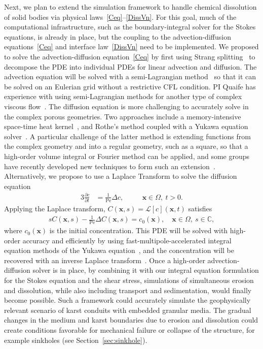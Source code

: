 \documentclass[11pt]{article}
\newcommand{\pd}[2]{ \frac{ \partial #1}{ \partial #2 } }
\newcommand{\bvec}[1]{{\mathbf{#1}}}
\newcommand{\Pe}{\mathrm{Pe}}
\newcommand{\xx}{\bvec{x}}
\begin{document}
Next, we plan to extend the simulation framework to handle chemical dissolution of solid bodies via physical laws~\eqref{Ceq}--\eqref{DissVn}. For this goal, much of the computational infrastructure, such as the boundary-integral solver for the Stokes equations, is already in place, but the coupling to the advection-diffusion equations~\eqref{Ceq} and interface law~\eqref{DissVn} need to be implemented.  We proposed to solve the advection-diffusion equation~\eqref{Ceq} by first using Strang splitting~\cite{str1968} to decompose the PDE into individual PDEs for linear advection and diffusion.  The advection equation will be solved with a semi-Lagrangian method~\cite{rob1981} so that it can be solved on an Eulerian grid without a restrictive CFL condition. PI Quaife has experience with using semi-Lagrangian methods for another type of complex viscous flow~\cite{kab-qua-bir2017}.  The diffusion equation is more challenging to accurately solve in the complex porous geometries.  Two approaches include a memory-intensive space-time heat kernel~\cite{bar-eps-gre-jia-wan2019, jia-gre-wan2015, li-gre2009}, and Rothe's method coupled with a Yukawa equation solver~\cite{kro-qua2010, cau-cho-chr-sea2016}. A particular challenge of the latter method is extending functions from the complex geometry and into a regular geometry, such as a square, so that a high-order volume integral or Fourier method can be applied, and some groups have recently developed new techniques to form such an extension~\cite{fry-kro-tor2019, fry-leh-tor2019}. Alternatively, we propose to use a Laplace Transform to solve the diffusion equation
\begin{alignat}{3}
  \pd{c}{t} &= \frac{1}{\Pe} \Delta c, \quad &&\xx \in \Omega, \: t>0.
\end{alignat}
Applying the Laplace transform, $C(\xx,s) = \mathcal{L}[c](\xx,t)$ satisfies
\begin{align}
  sC(\xx,s) - \frac{1}{\Pe}\Delta C(\xx,s) = c_0(\xx), 
    \quad \xx \in \Omega, \: s \in \mathbb{C},
  \label{eqn:DiffusionLaplace}
\end{align}
where $c_0(\xx)$ is the initial concentration. This PDE will be solved with high-order accuracy and efficiently by using fast-multipole-accelerated integral equation methods of the Yukawa equation~\cite{kro-qua2011}, and the concentration will be recovered with an inverse Laplace transform~\cite{jos-war2006}. Once a high-order advection-diffusion solver is in place, by combining it with our integral equation formulation for the Stokes equation and the shear stress, simulations of simultaneous erosion and dissolution, while also including transport and sedimentation, would finally become possible.  Such a framework could accurately simulate the geophysically relevant scenario of karst conduits with embedded granular media. The gradual changes in the medium and karst boundaries due to erosion and dissolution could create conditions favorable for mechanical failure or collapse of the structure, for example sinkholes (see Section~\ref{sec:sinkhole}).  
\end{document}
